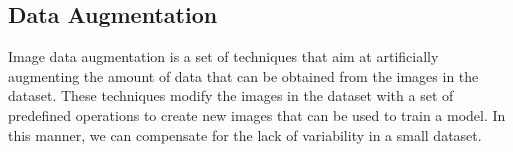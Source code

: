 \subsection{Data Augmentation}

Image data augmentation is a set of techniques that aim at artificially augmenting the amount of data that can be obtained from the images in the dataset. These techniques modify the images in the dataset  with a set of predefined operations to create new images that can be used to train a model.  In this manner, we can compensate  for the lack of  variability in a small dataset\cite{cubuk2019autoaugment}.
